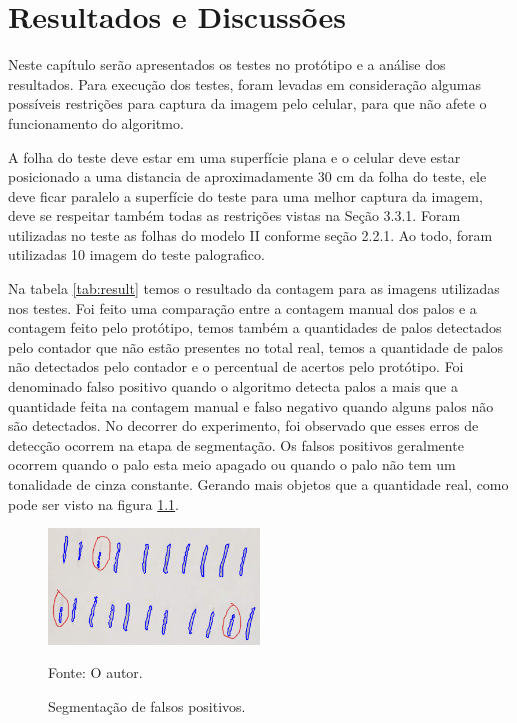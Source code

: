\chapter{Resultados e Discussões}
\label{cap:resultados}

Neste capítulo serão apresentados os testes no protótipo e a análise dos resultados. Para execução dos testes, foram levadas em consideração algumas possíveis restrições para captura da imagem pelo celular, para que não afete o funcionamento do algoritmo. 

A folha do teste deve estar em uma superfície plana e o celular deve estar posicionado a uma distancia de aproximadamente 30 cm da folha do teste, ele deve ficar paralelo a superfície do teste para uma melhor captura da imagem, deve se respeitar também todas as restrições vistas na Seção 3.3.1. Foram utilizadas no teste as folhas do modelo II conforme seção 2.2.1. Ao todo, foram utilizadas 10 imagem do teste palografico.

Na tabela \ref{tab:result}  temos o resultado da contagem para as imagens utilizadas nos testes. Foi feito uma comparação entre a contagem manual dos palos e a contagem feito pelo protótipo, temos também a quantidades de palos detectados pelo contador que não estão presentes no total real, temos a quantidade de palos não detectados pelo contador e o percentual de acertos pelo protótipo. Foi denominado falso positivo quando o algoritmo detecta palos a mais que a quantidade feita na contagem manual e falso negativo quando alguns palos não são detectados.
No decorrer do experimento, foi observado que esses erros de detecção ocorrem na etapa de segmentação. Os falsos positivos geralmente ocorrem quando o palo esta meio apagado ou quando o palo não tem um tonalidade de cinza constante. Gerando mais objetos que a quantidade real, como pode ser visto na figura \ref{fig:palo-seg}.

\begin{figure}[H]
 \centering
 \includegraphics[width=0.50\textwidth]{./fig/resultado-analise/seg-palo}
 \caption{Segmentação de falsos positivos.}
  Fonte: O autor.
 \label{fig:palo-seg}
\end{figure}


